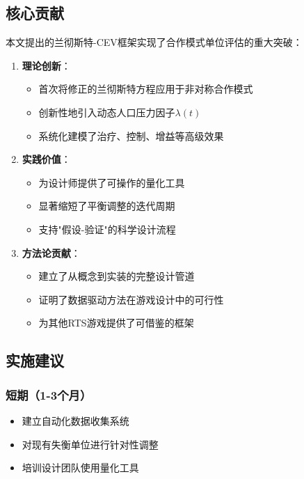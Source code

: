 \documentclass[a4paper,12pt]{article}
\begin{document}
\subsection{核心贡献}
本文提出的兰彻斯特-CEV框架实现了合作模式单位评估的重大突破：

\begin{enumerate}
\item \textbf{理论创新}：
   \begin{itemize}
   \item 首次将修正的兰彻斯特方程应用于非对称合作模式
   \item 创新性地引入动态人口压力因子$\lambda(t)$
   \item 系统化建模了治疗、控制、增益等高级效果
   \end{itemize}

\item \textbf{实践价值}：
   \begin{itemize}
   \item 为设计师提供了可操作的量化工具
   \item 显著缩短了平衡调整的迭代周期
   \item 支持"假设-验证"的科学设计流程
   \end{itemize}

\item \textbf{方法论贡献}：
   \begin{itemize}
   \item 建立了从概念到实装的完整设计管道
   \item 证明了数据驱动方法在游戏设计中的可行性
   \item 为其他RTS游戏提供了可借鉴的框架
   \end{itemize}
\end{enumerate}

\subsection{实施建议}

\subsubsection{短期（1-3个月）}
\begin{itemize}
\item 建立自动化数据收集系统
\item 对现有失衡单位进行针对性调整
\item 培训设计团队使用量化工具
\end{itemize}
\end{document}

